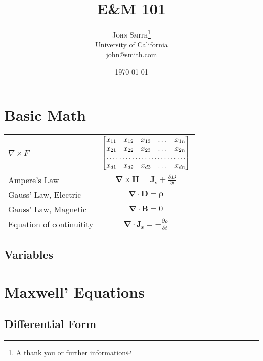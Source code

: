\documentclass[twoside,twocolumn]{article}
\title{E\&M 101} %
\author{%
    \textsc{John Smith}\thanks{A thank you or further information} \\[1ex] %
    \normalsize University of California \\ %
    \normalsize \href{mailto:john@smith.com}{john@smith.com} %
    }
\date{\today} %
\def \amperesLawDiff {\bm{\nabla \times H} = \bm{J_s}+\frac{\partial{D}}{\partial{t}}}
\def \gaussLawEDiff {\bm{\nabla \cdot D} = \bm{\rho}}
\def \gaussLawMDiff {\bm{\nabla \cdot B} = {0}}
\begin{document}
    
    \maketitle
    
    \section{Basic Math}

    \begin{tabular}{ l | c }
        \hline
        \hline			
        $\nabla \times F$ & $\begin{bmatrix}
            x_{11}       & x_{12} & x_{13} & \dots & x_{1n} \\
            x_{21}       & x_{22} & x_{23} & \dots & x_{2n} \\
            \hdotsfor{5} \\
            x_{d1}       & x_{d2} & x_{d3} & \dots & x_{dn}
        \end{bmatrix}$\\
        Ampere's Law & ${\amperesLawDiff}$\\
        
        Gauss' Law, Electric & ${\gaussLawEDiff}$\\
        Gauss' Law, Magnetic & ${\gaussLawMDiff}$\\
        \hline			

        Equation of continuitity & $\bm{\nabla\cdot{J_s}} = -\frac{\partial \rho}{\partial t}$\\

        \hline  
        
      \end{tabular}
    \subsection{Variables}
    \section{Maxwell' Equations}
    \subsection{Differential Form}
\end{document}

